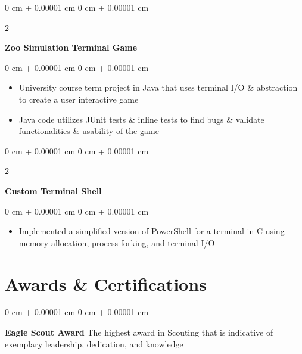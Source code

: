 \documentclass[10pt, letterpaper]{article}
\newenvironment{highlights}{
    \begin{itemize}[
        topsep=0.10 cm,
        parsep=0.10 cm,
        partopsep=0pt,
        itemsep=0pt,
        leftmargin=0 cm + 10pt
    ]
}{
    \end{itemize}
} %
\newenvironment{onecolentry}{
    \begin{adjustwidth}{
        0 cm + 0.00001 cm
    }{
        0 cm + 0.00001 cm
    }
}{
    \end{adjustwidth}
} %
\newenvironment{twocolentry}[2][]{
    \onecolentry%
    \def\secondColumn{#2}
    \setcolumnwidth{\fill, 7.0 cm}
    \begin{paracol}{2}
}{
    \switchcolumn\raggedleft\secondColumn%
    \end{paracol}
    \endonecolentry%
} %
\begin{document}
        
        \vspace{0.2 cm}

        \begin{twocolentry}{
            \href{https://github.com/thatchereames/animal-game}{\color{secondaryColor}{github.com/thatchereames/animal-game}}
        }
            \textbf{Zoo Simulation Terminal Game}\end{twocolentry}

        \vspace{0.10 cm}
        \begin{onecolentry}
            \begin{highlights}
                \item University course term project in Java that uses terminal I/O \& abstraction to create a user interactive game
                \item Java code utilizes JUnit tests \& inline tests to find bugs \& validate functionalities \& usability of the game 
            \end{highlights}
        \end{onecolentry}



        \vspace{0.2 cm}

        \begin{twocolentry}{
            \href{https://github.com/CSE29Winter2025Students/pa4-pioneer-shell-thatchereames}{\color{secondaryColor}{github.com/CSE29Winter2025Students/pa4}}
        }
            \textbf{Custom Terminal Shell}\end{twocolentry}

        \vspace{0.10 cm}
        \begin{onecolentry}
            \begin{highlights}
                \item Implemented a simplified version of PowerShell for a terminal in C using memory allocation, process forking, and terminal I/O
            \end{highlights}
        \end{onecolentry}

    
    {\color{secondaryColor}\section{Awards \& Certifications}}

        \begin{onecolentry}
            \textbf{Eagle Scout Award} The highest award in Scouting that is indicative of exemplary leadership, dedication, and knowledge
        \end{onecolentry}
\end{document}
